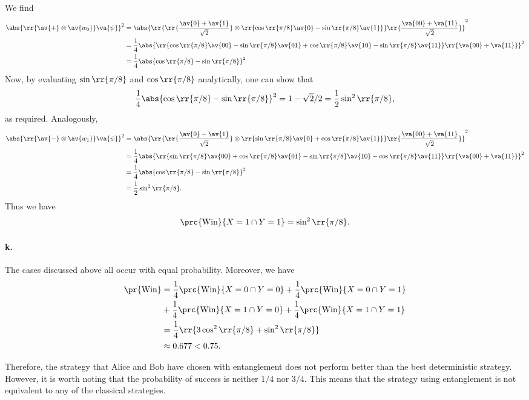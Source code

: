 \documentclass{article}
\begin{document}
We find
\begin{align*}
  \abs{\rr{\av{+}\otimes\av{w_0}}\va{\psi}}^2 &= \abs{\rr{\rr{\frac{\av{0}+\av{1}}{\sqrt{2}}}\otimes\rr{\cos\rr{\pi/8}\av{0}-\sin\rr{\pi/8}\av{1}}}\rr{\frac{\va{00}+\va{11}}{\sqrt{2}}}}^2 \\
                                              &= \frac{1}{4} \abs{\rr{\cos\rr{\pi/8}\av{00}-\sin\rr{\pi/8}\av{01}+\cos\rr{\pi/8}\av{10}-\sin\rr{\pi/8}\av{11}}\rr{\va{00}+\va{11}}}^2 \\
                                              &= \frac{1}{4} \abs{\cos\rr{\pi/8}-\sin\rr{\pi/8}}^2
\end{align*}
Now, by evaluating $\sin\rr{\pi/8}$ and $\cos\rr{\pi/8}$ analytically, one can show that
\begin{align*}
  \frac{1}{4} \abs{\cos\rr{\pi/8}-\sin\rr{\pi/8}}^2 = 1 - \sqrt{2}/{2} = \frac{1}{2}\sin^2\rr{\pi/8},
\end{align*}
as required. Analogously,
\begin{align*}
  \abs{\rr{\av{-}\otimes\av{w_1}}\va{\psi}}^2 &= \abs{\rr{\rr{\frac{\av{0}-\av{1}}{\sqrt{2}}}\otimes\rr{\sin\rr{\pi/8}\av{0}+\cos\rr{\pi/8}\av{1}}}\rr{\frac{\va{00}+\va{11}}{\sqrt{2}}}}^2 \\
                                              &= \frac{1}{4} \abs{\rr{\sin\rr{\pi/8}\av{00}+\cos\rr{\pi/8}\av{01}-\sin\rr{\pi/8}\av{10}-\cos\rr{\pi/8}\av{11}}\rr{\va{00}+\va{11}}}^2 \\
                                              &= \frac{1}{4} \abs{\cos\rr{\pi/8}-\sin\rr{\pi/8}}^2\\
                                              &=\frac{1}{2}\sin^2\rr{\pi/8}.
\end{align*}
Thus we have
\begin{align*}
  \prc{\text{Win}}{X=1\cap Y=1} = \sin^2\rr{\pi/8}.
\end{align*}

\paragraph{k.}

The cases discussed above all occur with equal probability. Moreover, we have
\begin{align*}
  \pr{\text{Win}} &= \frac{1}{4}\prc{\text{Win}}{X=0\cap Y=0} +\frac{1}{4}\prc{\text{Win}}{X=0\cap Y=1}\\
                  &+\frac{1}{4}\prc{\text{Win}}{X=1\cap Y=0} +\frac{1}{4}\prc{\text{Win}}{X=1\cap Y=1}\\
                  &=\frac{1}{4}\rr{3\cos^2\rr{\pi/8}+\sin^2\rr{\pi/8}} \\
                  &\approx 0.677 < 0.75.
\end{align*}

Therefore, the strategy that Alice and Bob have chosen with entanglement does not perform
better than the best deterministic strategy. However, it is worth noting that the probability
of success is neither $1/4$ nor $3/4$. This means that the strategy using entanglement
is not equivalent to any of the classical strategies.
\end{document}
